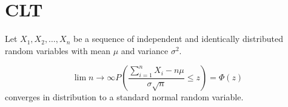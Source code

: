 \section{CLT}
\begin{description}
    \item Let $X_1, X_2, \dots, X_n$ 
    be a sequence of independent and identically distributed random
    variables with mean $\mu$ and variance $\sigma^2$.

    \[\lim{n\to\infty}P( \frac{\sum_{i=1}^n X_i - n\mu}{\sigma\sqrt{n}} \leq z) = \Phi(z)\]
    converges in distribution to a standard normal random variable.
\end{description}